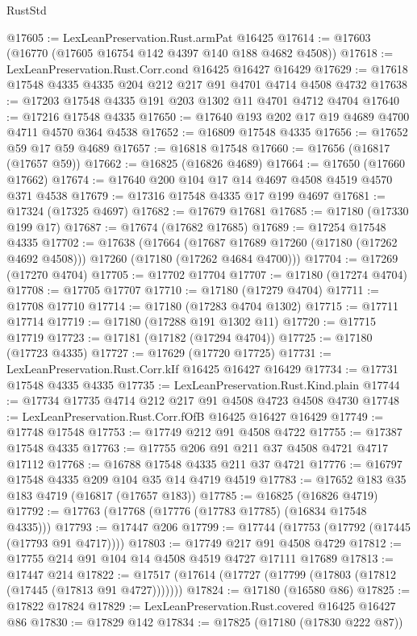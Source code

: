 \begin{lexlean}{RustStd}
\begin{coremodule}
{\begin{coremodule}
{{{{{{{{{{{{{{{{{{{{{{{{{{{{{{{{{{{{{{{{{{{{{{{{{{{{{{{@17605 := LexLeanPreservation.Rust.armPat @16425
@17614 := @17603 (@16770 (@17605 @16754 @142 @4397 @140 @188 @4682 @4508))
@17618 := LexLeanPreservation.Rust.Corr.cond @16425 @16427 @16429
@17629 := @17618 @17548 @4335 @4335 @204 @212 @217 @91 @4701 @4714 @4508 @4732
@17638 := @17203 @17548 @4335 @191 @203 @1302 @11 @4701 @4712 @4704
@17640 := @17216 @17548 @4335
@17650 := @17640 @193 @202 @17 @19 @4689 @4700 @4711 @4570 @364 @4538
@17652 := @16809 @17548 @4335
@17656 := @17652 @59 @17 @59 @4689
@17657 := @16818 @17548
@17660 := @17656 (@16817 (@17657 @59))
@17662 := @16825 (@16826 @4689)
@17664 := @17650 (@17660 @17662)
@17674 := @17640 @200 @104 @17 @14 @4697 @4508 @4519 @4570 @371 @4538
@17679 := @17316 @17548 @4335 @17 @199 @4697
@17681 := @17324 (@17325 @4697)
@17682 := @17679 @17681
@17685 := @17180 (@17330 @199 @17)
@17687 := @17674 (@17682 @17685)
@17689 := @17254 @17548 @4335
@17702 := @17638
    (@17664
      (@17687 @17689 @17260 (@17180 (@17262 @4692 @4508)))
      @17260
      (@17180 (@17262 @4684 @4700)))
@17704 := @17269 (@17270 @4704)
@17705 := @17702 @17704
@17707 := @17180 (@17274 @4704)
@17708 := @17705 @17707
@17710 := @17180 (@17279 @4704)
@17711 := @17708 @17710
@17714 := @17180 (@17283 @4704 @1302)
@17715 := @17711 @17714
@17719 := @17180 (@17288 @191 @1302 @11)
@17720 := @17715 @17719
@17723 := @17181 (@17182 (@17294 @4704))
@17725 := @17180 (@17723 @4335)
@17727 := @17629 (@17720 @17725)
@17731 := LexLeanPreservation.Rust.Corr.kIf @16425 @16427 @16429
@17734 := @17731 @17548 @4335 @4335
@17735 := LexLeanPreservation.Rust.Kind.plain
@17744 := @17734 @17735 @4714 @212 @217 @91 @4508 @4723 @4508 @4730
@17748 := LexLeanPreservation.Rust.Corr.fOfB @16425 @16427 @16429
@17749 := @17748 @17548
@17753 := @17749 @212 @91 @4508 @4722
@17755 := @17387 @17548 @4335
@17763 := @17755 @206 @91 @211 @37 @4508 @4721 @4717 @17112
@17768 := @16788 @17548 @4335 @211 @37 @4721
@17776 := @16797 @17548 @4335 @209 @104 @35 @14 @4719 @4519
@17783 := @17652 @183 @35 @183 @4719 (@16817 (@17657 @183))
@17785 := @16825 (@16826 @4719)
@17792 := @17763 (@17768 (@17776 (@17783 @17785) (@16834 @17548 @4335)))
@17793 := @17447 @206
@17799 := @17744 (@17753 (@17792 (@17445 (@17793 @91 @4717))))
@17803 := @17749 @217 @91 @4508 @4729
@17812 := @17755 @214 @91 @104 @14 @4508 @4519 @4727 @17111 @17689
@17813 := @17447 @214
@17822 := @17517 (@17614 (@17727 (@17799 (@17803 (@17812 (@17445 (@17813 @91 @4727)))))))
@17824 := @17180 (@16580 @86)
@17825 := @17822 @17824
@17829 := LexLeanPreservation.Rust.covered @16425 @16427 @86
@17830 := @17829 @142
@17834 := @17825 (@17180 (@17830 @222 @87))
}}}}}}}}}}}}}}}}}}}}}}}}}}}}}}}}}}}}}}}}}}}}}}}}}}}}}}}
\end{coremodule}}
\end{coremodule}
\end{lexlean}
